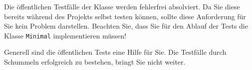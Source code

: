 Die \"offentlichen Testf\"alle der Klasse \texttt{\minTest} werden fehlerfrei absolviert. Da Sie diese 
bereits w\"ahrend des Projekts selbst testen k\"onnen, sollte diese Anforderung 
f\"ur Sie kein Problem darstellen. Beachten Sie, dass Sie f\"ur den Ablauf der Tests
die Klasse \texttt{\testAdapter\-Minimal} implementieren m\"ussen!

Generell sind die \"offentlichen Tests eine Hilfe f\"ur Sie. Die Testf\"alle durch
\glqq{}Schummeln\grqq{} erfolgreich zu bestehen, bringt Sie nicht weiter. 
